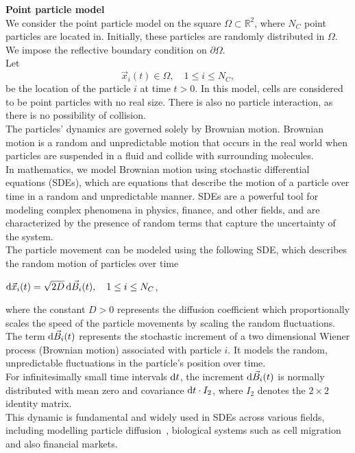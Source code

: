 \textbf{Point particle model} \\
We consider the point particle model on the square $\Omega \subset \mathbb{R}^2$, where $N_C$ point particles are located in.
Initially, these particles are randomly distributed in $\Omega$. 
We impose the reflective boundary condition on $\partial \Omega$. \\
Let 
\[
\vec{x}_i(t) \in \Omega, \quad 1 \leq i \leq N_C,
\]
be the location of the particle $i$ at time $t > 0$. 
In this model, cells are considered to be point particles with no real size. 
There is also no particle interaction, as there is no possibility of collision. \\
The particles' dynamics are governed solely by Brownian motion.
Brownian motion is a random and unpredictable motion that occurs in the real world when particles are suspended in a fluid and collide with surrounding molecules. \\
In mathematics, we model Brownian motion using stochastic differential equations (SDEs), which are equations that describe the motion of a particle over time in a random and unpredictable manner. 
SDEs are a powerful tool for modeling complex phenomena in physics, finance, and other fields, and are characterized by the presence of random terms that capture the uncertainty of the system. \\
The particle movement can be modeled using the following SDE, which describes the random motion of particles over time
\begin{center}
	$\mathrm{d} \vec{x}_i(t) = \sqrt{2D} \, \mathrm{d} \vec{B}_i(t), \quad 1 \leq i \leq N_C$,
\end{center}
where the constant $D > 0$ represents the diffusion coefficient which proportionally scales the speed of the particle movements by scaling the random fluctuations. \\
The term $\mathrm{d} \vec{B}_i(t) $ represents the stochastic increment of a two dimensional Wiener process (Brownian motion) associated with particle $i$. 
It models the random, unpredictable fluctuations in the particle's position over time. \\
For infinitesimally small time intervals $ \mathrm{d} t $, the increment $ \mathrm{d} \vec{B}_i(t) $ is normally distributed with mean zero and covariance $ \mathrm{d} t \cdot I_2$, where $I_2$ denotes the $2 \times 2$ identity matrix. \\  
This dynamic is fundamental and widely used in SDEs across various fields, including modelling particle diffusion~\cite{Bruna2012}, biological systems such as cell migration and also financial markets. \\ 

